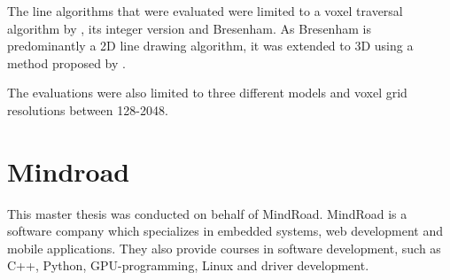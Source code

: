 The line algorithms that were evaluated were limited to a voxel traversal algorithm by , its integer version and Bresenham.
As Bresenham is predominantly a 2D line drawing algorithm, it was extended to 3D using a method proposed by .

The evaluations were also limited to three different models and voxel grid resolutions between 128-2048.

\newpage

\section{Mindroad}
This master thesis was conducted on behalf of MindRoad. 
MindRoad is a software company which specializes in embedded systems, web development and mobile applications. 
They also provide courses in software development, such as C++, Python, GPU-programming, Linux and driver development. 
